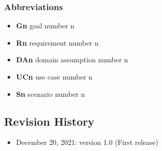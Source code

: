 \subsubsection{Abbreviations}
\begin{itemize}
        \item \textbf{Gn} goal number n
        \item \textbf{Rn} requirement number n
        \item \textbf{DAn} domain assumption number n
        \item \textbf{UCn} use case number n
        \item \textbf{Sn} scenario number n
\end{itemize}

\subsection{Revision History}
\begin{itemize}
        \item December 20, 2021: version 1.0 (First release)
\end{itemize}

